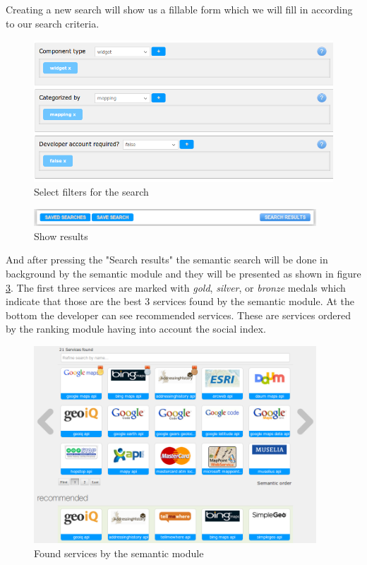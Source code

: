Creating a new search will show us a fillable form which we will fill in according to our search criteria. 

\begin{figure}[h]
	\centering
	\includegraphics[width=400pt]{graphics/omr-client-filters.png}
	\caption{Select filters for the search}
	\label{fig:selectfilters}
\end{figure}

\begin{figure}[h]
	\centering
	\includegraphics[width=300pt]{graphics/omr-client-show-results.png}
	\caption{Show results}
	\label{fig:selectsearch}
\end{figure}


\newpage

And after pressing the "Search results" the semantic search will be done in background by the semantic module and they will be presented as shown in figure \ref{fig:foundservices}. The first three services are marked with \textit{gold}, \textit{silver}, or \textit{bronze} medals which indicate that those are the best 3 services found by the semantic module. At the bottom the developer can see recommended services. These are services ordered by the ranking module having into account the social index.

\begin{figure}[h]
	\centering
	\includegraphics[width=300pt]{graphics/found-services.png}
	\caption{Found services by the semantic module}
	\label{fig:foundservices}
\end{figure}

